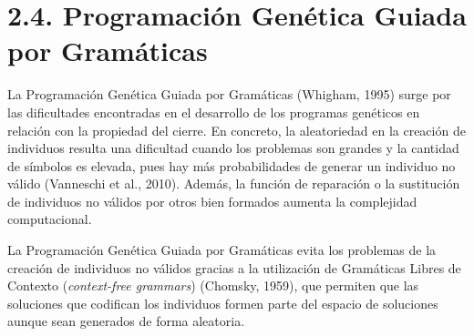 \documentclass[spanish,a4paper,12pt,twoside]{report}
\begin{document}
  \section*{\Large 2.4. Programación Genética Guiada por Gramáticas}
  La Programación Genética Guiada por Gramáticas (Whigham, 1995) surge por las dificultades encontradas en el desarrollo de los programas genéticos en relación con la propiedad del cierre. En concreto, la aleatoriedad en la creación de individuos resulta una dificultad cuando los problemas son grandes y la cantidad de símbolos es elevada, pues hay más probabilidades de generar un individuo no válido (Vanneschi et al., 2010). Además, la función de reparación o la sustitución de individuos no válidos por otros bien formados aumenta la complejidad computacional. \par
  La Programación Genética Guiada por Gramáticas evita los problemas de la creación de individuos no válidos gracias a la utilización de Gramáticas Libres de Contexto (\emph{context-free grammars}) (Chomsky, 1959), que permiten que las soluciones que codifican los individuos formen parte del espacio de soluciones aunque sean generados de forma aleatoria.
  
\end{document}
